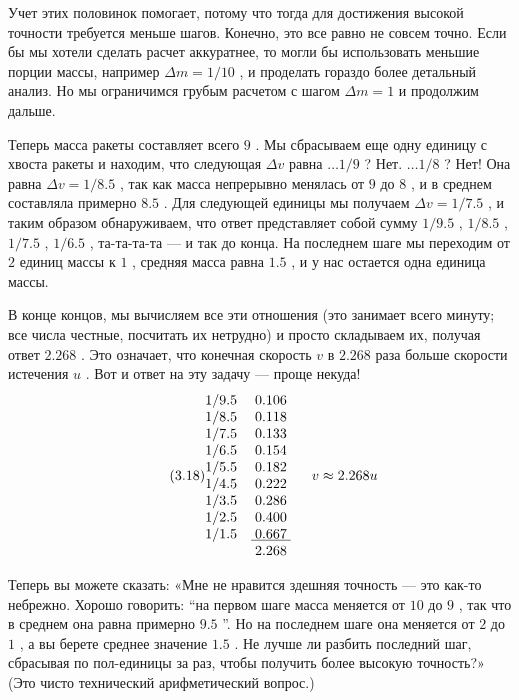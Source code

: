 \documentclass[11pt,oneside]{article}
\begin{document}
Учет этих половинок помогает, потому что тогда для достижения высокой точности требуется меньше шагов. Конечно, это все равно не совсем точно. Если бы мы хотели сделать расчет аккуратнее, то могли бы использовать меньшие порции массы, например \(\Delta m = 1/10\) , и проделать гораздо более детальный анализ. Но мы ограничимся грубым расчетом с шагом \(\Delta m = 1\) и продолжим дальше.\par

Теперь масса ракеты составляет всего \(9\) . Мы сбрасываем еще одну единицу с хвоста ракеты и находим, что следующая \(\Delta v\) равна \(\dots1/9\) ? Нет. \(\dots1/8\) ? Нет! Она равна \(\Delta v = 1/8.5\) , так как масса непрерывно менялась от \(9\) до \(8\) , и в среднем составляла примерно \(8.5\) . Для следующей единицы мы получаем \(\Delta v = 1/7.5\) , и таким образом обнаруживаем, что ответ представляет собой сумму \(1/9.5\) , \(1/8.5\) , \(1/7.5\) , \(1/6.5\) , та-та-та-та --- и так до конца. На последнем шаге мы переходим от \(2\) единиц массы к \(1\) , средняя масса равна \(1.5\) , и у нас остается одна единица массы.\par

В конце концов, мы вычисляем все эти отношения (это занимает всего минуту; все числа честные, посчитать их нетрудно) и просто складываем их, получая ответ \(2.268\) . Это означает, что конечная скорость \(v\) в \(2.268\) раза больше скорости истечения \(u\) . Вот и ответ на эту задачу --- проще некуда! 
\begin{equation*} \tag{3.18}
\label{Eq:TIPS:3:18} \begin{matrix} 1/9.5 & 0.106 \\ 1/8.5 & 0.118 \\ 1/7.5 & 0.133 \\ 1/6.5 & 0.154 \\ 1/5.5 & 0.182 \\ 1/4.5 & 0.222 \\ 1/3.5 & 0.286 \\ 1/2.5 & 0.400 \\ 1/1.5 & \underline{\;0.667\;} \\ & 2.268 \end{matrix} \kern 1.5em v \approx 2.268 u \end{equation*}
\par

Теперь вы можете сказать: «Мне не нравится здешняя точность --- это как-то небрежно. Хорошо говорить: ``на первом шаге масса меняется от \(10\) до \(9\) , так что в среднем она равна примерно \(9.5\) ''. Но на последнем шаге она меняется от \(2\) до \(1\) , а вы берете среднее значение \(1.5\) . Не лучше ли разбить последний шаг, сбрасывая по пол-единицы за раз, чтобы получить более высокую точность?» (Это чисто технический арифметический вопрос.)\par
\end{document}
